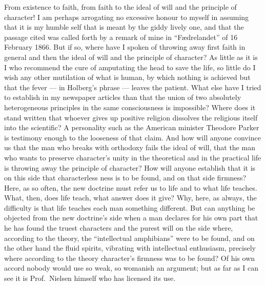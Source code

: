 \documentclass[12pt,a4paper]{book}
\newcommand{\opage}[1]{\marginnote{\footnotesize\textit{[#1]}}}
\begin{document}
From existence to faith, from faith to the ideal of will and the principle of
character! I am perhaps arrogating no excessive honour to myself in assuming
that it is my humble self that is meant by the giddy lively one, and that the
passage cited was called forth by a remark of mine in ``Fædrelandet'' of 16
February 1866. But if so, where have I spoken of throwing away first faith in
general and then the ideal of will and the principle of character? As little as
it is I who recommend the cure of amputating the head to save the life, so
little do I wish any other mutilation of what is human, by which nothing is
achieved but that the fever --- in Holberg's phrase --- leaves the patient.
What else have I
\opage{74}tried to establish in my newspaper articles than that the union of
two absolutely heterogeneous principles in the same consciousness is
impossible? Where does it stand written that whoever gives up positive religion
dissolves the religious itself into the scientific? A personality such as the
American minister Theodore Parker is testimony enough to the looseness of that
claim. And how will anyone convince us that the man who breaks with orthodoxy
fails the ideal of will, that the man who wants to preserve character's unity
in the theoretical and in the practical life is throwing away the principle of
character? How will anyone establish that it is on this side that characterless
ness is to be found, and on that side firmness? Here, as so often, the new
doctrine must refer us to life and to what life teaches. What, then, does life
teach, what answer does it give? Why, here, as always, the difficulty is that
life teaches each man something different. But can anything be objected from
the new doctrine's side when a man declares for his own part that he has found
the truest characters and the purest will on the side where, according to the
theory, the ``intellectual amphibians'' were to be found, and on the other
hand the fluid spirits, vibrating with intellectual enthusiasm, precisely where
according to the theory character's firmness was to be found? Of his own accord
nobody would use so weak, so womanish an argument; but as far as I can see it
is Prof.\ Nielsen himself who has licensed its use.
\end{document}
